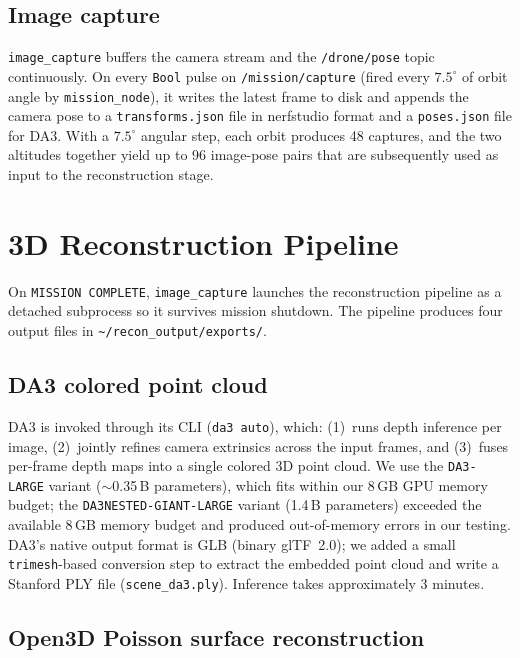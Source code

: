 \documentclass[conference]{IEEEtran}
\begin{document}
\subsection{Image capture}

\texttt{image\_capture} buffers the camera stream and the
\texttt{/drone/pose} topic continuously. On every \texttt{Bool}
pulse on \texttt{/mission/capture} (fired every $7.5^{\circ}$ of
orbit angle by \texttt{mission\_node}), it writes the latest
frame to disk and appends the camera pose to a
\texttt{transforms.json} file in nerfstudio format and a
\texttt{poses.json} file for DA3. With a $7.5^{\circ}$ angular
step, each orbit produces 48 captures, and the two altitudes
together yield up to 96 image-pose pairs that are subsequently
used as input to the reconstruction stage.

\section{3D Reconstruction Pipeline}
\label{sec:recon}

On \texttt{MISSION COMPLETE}, \texttt{image\_capture} launches the
reconstruction pipeline as a detached subprocess so it survives
mission shutdown. The pipeline produces four output files in
\texttt{\textasciitilde/recon\_output/exports/}.

\subsection{DA3 colored point cloud}

DA3 is invoked through its CLI (\texttt{da3 auto}), which:
(1)~runs depth inference per image, (2)~jointly refines camera
extrinsics across the input frames, and (3)~fuses per-frame depth
maps into a single colored 3D point cloud. We use the
\texttt{DA3-LARGE} variant ($\sim$0.35\,B parameters), which fits
within our 8\,GB GPU memory budget; the
\texttt{DA3NESTED-GIANT-LARGE} variant (1.4\,B parameters) exceeded
the available 8\,GB memory budget and produced out-of-memory errors
in our testing. DA3's native output format is GLB (binary glTF~2.0);
we added a small \texttt{trimesh}-based conversion step to extract
the embedded point cloud and write a Stanford PLY file
(\texttt{scene\_da3.ply}). Inference takes approximately
3 minutes.

\subsection{Open3D Poisson surface reconstruction}
\end{document}
